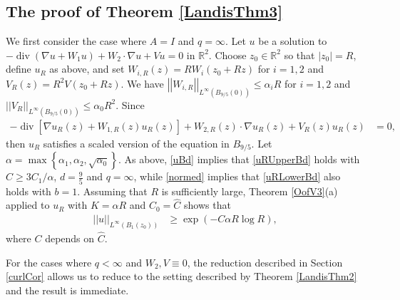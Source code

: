 \documentclass[12pt,reqno]{amsart}
\theoremstyle{plain}
\theoremstyle{definition}
\newcommand{\disp}{\displaystyle}
\DeclareMathOperator{\di}{div}
\newcommand{\al}{\alpha}
\newcommand{\iny}{\infty}
\newcommand{\gr}{\nabla}
\newcommand{\norm}[1]{\left\vert \left\vert #1\right\vert\right\vert}
\newcommand{\abs}[1]{\left\vert#1\right\vert}
\newcommand{\set}[1]{\left\{#1\right\}}
\newcommand{\brac}[1]{\left[#1\right]}
\newcommand{\pr}[1]{\left( #1 \right) }
\newcommand{\R}{\ensuremath{\mathbb{R}}}
\begin{document}
\subsection{The proof of Theorem \ref{LandisThm3}}
We first consider the case where $A = I$ and $q = \iny$.
Let $u$ be a solution to $\disp -\di\pr{\gr u + W_1 u} + W_2 \cdot \gr u + V u = 0$ in $\R^2$.
Choose $z_0 \in \R^2$ so that $\abs{z_0} = R$, define $u_R$ as above, and set $W_{i, R}\pr{z} =R W_i\pr{z_0 + Rz}$ for $i = 1,2$ and $V_{R}\pr{z} =R^2 V\pr{z_0 + Rz}$.
We have $\disp \norm{W_{i, R}}_{L^{\iny}\pr{B_{9/5}\pr{0}}}  \le \al_i R$ for $i = 1,2$ and $\disp \norm{V_{R}}_{L^{\iny}\pr{B_{9/5}\pr{0}}}  \le \al_0 R^2$.
Since
\begin{align*}
 - \di\brac{ \gr u_R\pr{z} + W_{1,R}\pr{z} u_R\pr{z}} + W_{2,R}\pr{z} \cdot \gr u_R\pr{z} + V_R\pr{z} u_R\pr{z}
&= 0,
\end{align*}
then $u_R$ satisfies a scaled version of the equation in $B_{9/5}$.
Let $\al = \max\set{\al_1, \al_2, \sqrt{\al_0}}$.
As above, \eqref{uBd} implies that \eqref{uRUpperBd} holds with $\hat C \ge 3 C_1/\al$, $d = \frac 9 5$ and $q = \iny$, while \eqref{normed} implies that \eqref{uRLowerBd} also holds with $b = 1$.
Assuming that $R$ is sufficiently large, Theorem \ref{OofV3}(a) applied to $u_R$ with $K = \al R$ and $C_0 = \hat C$ shows that
\begin{align*}
\norm{u}_{L^\iny\pr{{B_{1}(z_0)}}} 
&\ge \exp\pr{- C \al R \log R },
\end{align*}
where $C$ depends on $\hat C$.

For the cases where $q < \iny$ and $W_2, V \equiv 0$, the reduction described in Section \ref{curlCor} allows us to reduce to the setting described by Theorem \ref{LandisThm2} and the result is immediate.
\end{document}
